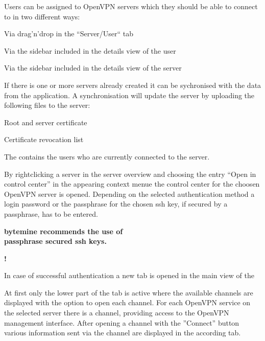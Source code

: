 \nl Users can be assigned to OpenVPN servers which they should be able to
connect to in two different ways:

\begin{items}
   \item Via drag'n'drop in the ``Server/User`` tab
   \item Via the sidebar included in the details view of the user
   \item Via the sidebar included in the details view of the server
\end{items}


\nl If there is one or more servers already created it can be sychronised
with the data from the application. A synchronisation will update the server
by uploading the following files to the server:
\begin{items}
\item Root and server certificate
\item Certificate revocation list
\item \Npwf{}
\end{items}
The \Npwf{} contains the users who are currently connected to the server.

\newpage
{}



\nl By rightclicking a server in the server overview and choosing the entry
``Open in control center'' in the appearing context menue the control center
for the choosen OpenVPN server is opened. Depending on the selected
authentication method
a login password or the passphrase for the chosen ssh key, if secured by a
passphrase, has to be entered.\\

\noindent
\begin{center}
 \parbox[b]{84mm}{\textbf{\small
  bytemine recommends the use of\\
  passphrase secured ssh keys.
 }}{\Huge\bfseries!}
\end{center}

\nl In case of successful authentication a new tab is opened in the main
view of the \Nbm{}

At first only the lower part of the tab is active where the available
channels are displayed with the option to open each channel.
%
For each OpenVPN service on the selected server there is a channel,
providing access to the OpenVPN management interface.
%
After opening a channel with the ''Connect'' button various information
sent via the channel are displayed in the according tab.

